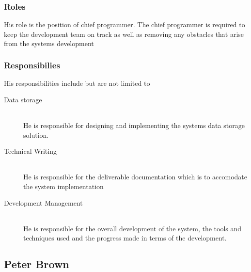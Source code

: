 
\subsubsection{Roles}

	His role is the position of chief programmer. The chief programmer is required to keep the development team on track as well as removing any obstacles that arise from the systems development


\subsubsection{Responsibilies}

	His responsibilities include but are not limited to

	\begin{description}
		\item[Data storage] \hfill \\ He is responsible for designing and implementing the systems data storage solution.
		\item[Technical Writing] \hfill \\ He is responsible for the deliverable documentation which is to accomodate the system implementation
		\item[Development Management] \hfill \\ He is responsible for the overall development of the system, the tools and techniques used and the progress made in terms of the development.
	\end{description}


\subsection{Peter Brown}

